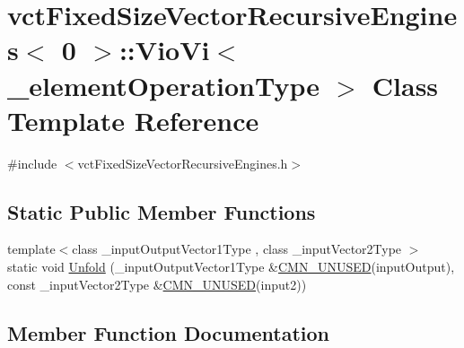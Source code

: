 \hypertarget{classvct_fixed_size_vector_recursive_engines_3_010_01_4_1_1_vio_vi}{}\section{vct\+Fixed\+Size\+Vector\+Recursive\+Engines$<$ 0 $>$\+:\+:Vio\+Vi$<$ \+\_\+element\+Operation\+Type $>$ Class Template Reference}
\label{classvct_fixed_size_vector_recursive_engines_3_010_01_4_1_1_vio_vi}


{\ttfamily \#include $<$vct\+Fixed\+Size\+Vector\+Recursive\+Engines.\+h$>$}

\subsection*{Static Public Member Functions}
\begin{DoxyCompactItemize}
\item 
{\footnotesize template$<$class \+\_\+input\+Output\+Vector1\+Type , class \+\_\+input\+Vector2\+Type $>$ }\\static void \hyperlink{classvct_fixed_size_vector_recursive_engines_3_010_01_4_1_1_vio_vi_a882e1912000e51bd1315de2427173625}{Unfold} (\+\_\+input\+Output\+Vector1\+Type \&\hyperlink{cmn_portability_8h_a021894e2626935fa2305434b1e893ff6}{C\+M\+N\+\_\+\+U\+N\+U\+S\+E\+D}(input\+Output), const \+\_\+input\+Vector2\+Type \&\hyperlink{cmn_portability_8h_a021894e2626935fa2305434b1e893ff6}{C\+M\+N\+\_\+\+U\+N\+U\+S\+E\+D}(input2))
\end{DoxyCompactItemize}


\subsection{Member Function Documentation}
\hypertarget{classvct_fixed_size_vector_recursive_engines_3_010_01_4_1_1_vio_vi_a882e1912000e51bd1315de2427173625}{}
